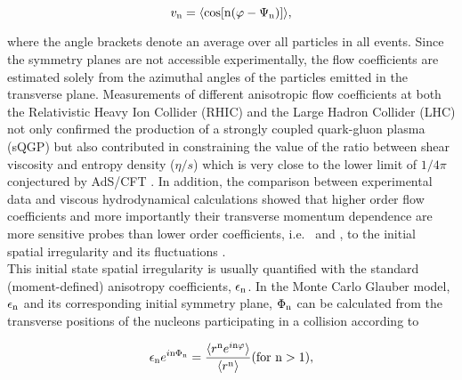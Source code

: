 \begin{equation}
v_{\rm n} = \langle{\cos[{\rm n}(\varphi - \Psi_{\rm n})]}\rangle,
\label{Eq:vn}
\end{equation}

where the angle brackets denote an average over all particles in all events. Since the symmetry planes are not accessible experimentally, the flow coefficients are estimated solely from the azimuthal angles of the particles emitted in the transverse plane. Measurements of different anisotropic flow coefficients at both the Relativistic Heavy Ion Collider (RHIC) \cite{Adams:2003am,Abelev:2007qg,Adler:2003kt,Adare:2006ti,Alver:2007qw,Adcox:2002ms,Adamczyk:2013gw,Adler:2004cj,Afanasiev:2009wq,Adare:2011tg,Ackermann:2000tr,Adler:2001nb,Adler:2002ct,Adler:2002pu,Adams:2003zg,Adams:2004wz,Adams:2004bi} and the Large Hadron Collider (LHC) \cite{Aamodt:2010pa, ALICE:2011ab, Abelev:2012di, Chatrchyan:2012xq, Chatrchyan:2012ta, ATLAS:2011ah, ATLAS:2012at,Abelev:2014pua,Adam:2016nfo,Adam:2016izf, Acharya:2018zuq,
Chatrchyan:2013kba, Adam:2015eta, Acharya:2018lmh,Acharya:2018ihu} not only confirmed the production of a strongly coupled quark-gluon plasma (sQGP) but also contributed in constraining the value of the ratio between shear viscosity and entropy density ($\eta/s$) which is very close to the lower limit of $1/4\pi$ conjectured by AdS/CFT \cite{Kovtun:2004de}. In addition, the comparison between experimental data \cite{Adam:2016izf} and viscous hydrodynamical calculations \cite{Niemi:2015voa} showed that higher order flow coefficients and more importantly their transverse momentum dependence are more sensitive probes than lower order coefficients, i.e. \vtwo~and \vthree, to the initial spatial irregularity and its fluctuations \cite{Alver:2010dn}.\\  
This initial state spatial irregularity is usually quantified with the standard (moment-defined) anisotropy coefficients, $\epsilon_{\rm n}$. In the Monte Carlo Glauber model, $\epsilon_{\rm n}$ and its corresponding initial symmetry plane, $\Phi_{\rm n}$ can be calculated from the transverse positions of the nucleons participating in a collision according to \cite{Teaney:2010vd, Alver:2010gr}

\begin{equation}
\epsilon_{\rm n}e^{i{\rm n}\Phi_{\rm n}} = \frac{\langle{r^{\rm n}e^{i{\rm n}\varphi}}\rangle}{\langle r^{\rm n}\rangle}  ({\rm for}~{\rm n}>1),
\label{Eq:epsilonn}
\end{equation}

